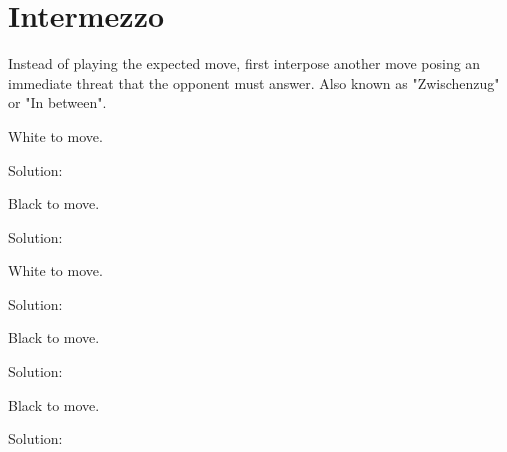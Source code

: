 \documentclass{book}
\begin{document}
\section{Intermezzo}
Instead of playing the expected move, first interpose another move posing an immediate threat that the opponent must answer. Also known as "Zwischenzug" or "In between".\begin{multicols}{2} 
\begin{samepage} 
\newgame 


 
\showboard
 
 White to move. 
 
Solution: 
 
\end{samepage}\begin{samepage} 
\newgame 


 
\showboard
 
 Black to move. 
 
Solution: 
 
\end{samepage}\begin{samepage} 
\newgame 


 
\showboard
 
 White to move. 
 
Solution: 
 
\end{samepage}\begin{samepage} 
\newgame 


 
\showboard
 
 Black to move. 
 
Solution: 
 
\end{samepage}\begin{samepage} 
\newgame 


 
\showboard
 
 Black to move. 
 
Solution: 
 
\end{samepage}\end{multicols} 
\newpage 
\end{document}
